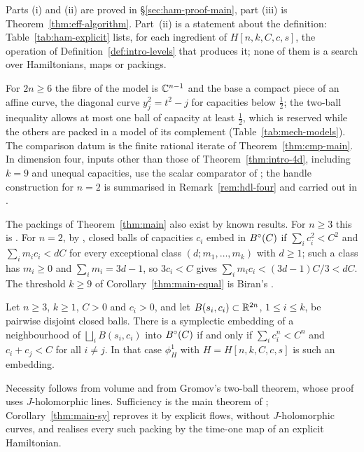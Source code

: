 Parts (i) and (ii) are proved in \S\ref{sec:ham-proof-main}, part (iii) is
Theorem~\ref{thm:eff-algorithm}. Part~(ii) is a statement about the definition: Table~\ref{tab:ham-explicit}
lists, for each ingredient of $H[n,k,C,c,s]$, the operation of Definition~\ref{def:intro-levels} that produces
it; none of them is a search over Hamiltonians, maps or packings.

For $2n\ge6$ the fibre of the model is $\mathbb{C}^{n-1}$ and the base a compact piece of an affine curve, the diagonal
curve $y_j^2=t^2-j$ for capacities below $\frac12$; the two-ball inequality allows at most one ball of capacity at
least $\frac12$, which is reserved while the others are packed in a model of its complement
(Table~\ref{tab:mech-models}). The comparison datum is the finite rational iterate of Theorem~\ref{thm:cmp-main}.
In dimension four, inputs other than those of Theorem~\ref{thm:intro-4d}, including $k=9$ and unequal capacities, use
the scalar comparator of ; the handle construction for $n=2$ is summarised in Remark~\ref{rem:hdl-four} and carried out in
.

The packings of Theorem~\ref{thm:main} also exist by known results. For $n\ge3$ this is \cite{OpenAI2026}. For $n=2$, by \cite{McDuffPolterovich1994,McDuff1998,LiLiu2001,LiLi2002}, closed balls
of capacities $c_i$ embed in $B^{\circ}(C)$ if $\sum_ic_i^2<C^2$ and $\sum_im_ic_i<dC$ for every exceptional class
$(d;m_1,\dots,m_k)$ with $d\ge1$; such a class has $m_i\ge0$ and $\sum_im_i=3d-1$, so $3c_i<C$ gives
$\sum_im_ic_i<(3d-1)C/3<dC$. The threshold $k\ge9$ of Corollary~\ref{thm:main-equal} is Biran's \cite{Biran1997}.

\begin{maincorollary}\label{thm:main-sy}
Let $n\ge3$, $k\ge1$, $C>0$ and $c_i>0$, and let $B(s_i,c_i)\subset\mathbb{R}^{2n}$, $1\le i\le k$, be pairwise disjoint closed balls.
There is a symplectic embedding of a neighbourhood of $\bigsqcup_iB(s_i,c_i)$ into $B^{\circ}(C)$ if and only if
$\sum_ic_i^n<C^n$ and $c_i+c_j<C$ for all $i\ne j$. In that case $\phi^1_H$ with $H=H[n,k,C,c,s]$ is such
an embedding.
\end{maincorollary}

Necessity follows from volume and from Gromov's two-ball theorem, whose proof uses $J$-holomorphic lines.
Sufficiency is the main theorem of \cite{OpenAI2026}; Corollary~\ref{thm:main-sy} reproves it by explicit flows,
without $J$-holomorphic curves, and realises every such packing by the time-one map of an explicit Hamiltonian.

